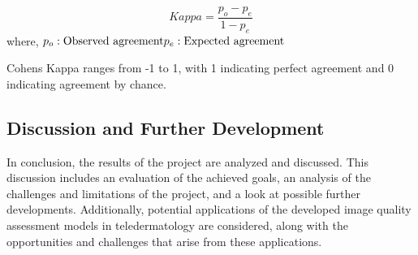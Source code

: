 \begin{equation}
    Kappa = \frac{p_o - p_e}{1 - p_e}
\end{equation}
\noindent
where, \newline
$p_o: \text{Observed agreement} \\ p_e: \text{Expected agreement}$ \par
\vspace{\baselineskip}
\noindent
Cohens Kappa ranges from -1 to 1, with 1 indicating perfect agreement and 0 indicating agreement by chance. \par

\subsection{Discussion and Further Development}
\label{sub:DiscussionDevelopment}
In conclusion, the results of the project are analyzed and discussed. This discussion includes an evaluation of the achieved goals, an analysis of the challenges and limitations of the project, and a look at possible further developments. Additionally, potential applications of the developed image quality assessment models in teledermatology are considered, along with the opportunities and challenges that arise from these applications. \par